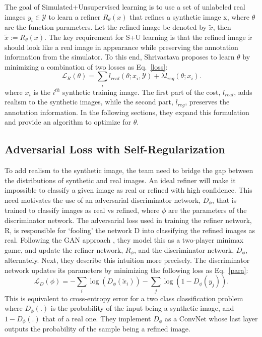 \documentclass[10pt,twocolumn,letterpaper]{article}
\begin{document}
The goal of Simulated+Unsupervised learning is to use a set of unlabeled real images $y_i\in \mathcal{Y}$ to learn a refiner $R_\theta(x)$ that refines a synthetic image x, where $\theta$ are the function parameters. Let the refined image be denoted by $\tilde{x}$, then $\tilde{x}:= R_\theta(x)$. The key requirement for S+U learning is that the refined image $\tilde{x}$ should look like a real image in appearance while preserving the annotation information from the simulator. To this end, Shrivastava proposes to learn $\theta$ by minimizing a combination of two losses as Eq.~\ref{loss}:
\begin{equation}
\mathcal{L}_R(\theta)=\sum_{i}l_{real}(\theta;x_i,\mathcal{Y})+\lambda l_{reg}(\theta;x_i).   \label{loss}
\end{equation}
where $x_i$ is the $i^{th}$ synthetic training image. The first part of the cost, $l_{real}$, adds realism to the synthetic images, while the second part, $l_{reg}$, preserves the annotation information. In the following sections, they expand this formulation and provide an algorithm to optimize for $\theta$.

\subsection{Adversarial Loss with Self-Regularization}

To add realism to the synthetic image, the team need to bridge the gap between the distributions of synthetic and real images. An ideal refiner will make it impossible to classify a given image as real or refined with high confidence. This need motivates the use of an adversarial discriminator network, $D_\phi$, that is trained to classify images as real vs refined, where $\phi$ are the parameters of the discriminator network. The adversarial loss used in training the refiner network, R, is responsible for `fooling' the network D into classifying the refined images as real. Following the GAN approach \cite{Goodfellow2014Generative}, they model this as a two-player minimax game, and update the refiner network, $R_\phi$, and the discriminator network, $D_\phi$, alternately. Next, they describe this intuition more precisely. The discriminator network updates its parameters by minimizing the following loss as Eq.~\ref{para}:
\begin{equation}
\mathcal{L}_D(\phi)=-\sum_{i}\log(D_\phi(\tilde{x}_i))-\sum_{j}\log(1-D_\phi(y_j)).   \label{para}
\end{equation}
This is equivalent to cross-entropy error for a two class classification problem where $D_\phi(.)$ is the probability of the input being a synthetic image, and $1−D_\phi(.)$ that of a real one. They implement $D_\phi$ as a ConvNet whose last layer outputs the probability of the sample being a refined image.
\end{document}
